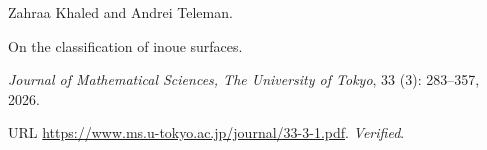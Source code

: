 Zahraa Khaled and Andrei Teleman.

\newblock On the classification of inoue surfaces.

\newblock \emph{Journal of Mathematical Sciences, The University of Tokyo},
  33 (3): 283--357, 2026{}.

\newblock URL \url{https://www.ms.u-tokyo.ac.jp/journal/33-3-1.pdf}.
\newblock \emph{Verified}.

